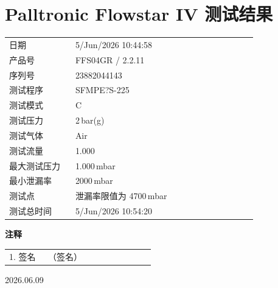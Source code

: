 \documentclass[UTF8,10pt,a4paper,fontset=fandol]{ctexart}
\newcommand{\fieldvalue}[1]{#1}
\newcommand{\handwritten}[1]{#1}
\begin{document}
\section*{Palltronic Flowstar IV 测试结果}

\begin{tabular}{@{}p{0.24\linewidth}p{0.66\linewidth}@{}}
日期 &
\fieldvalue{5/Jun/2026 10:44:58}
\\
产品号 &
\fieldvalue{FFS04GR / 2.2.11}
\\
序列号 &
\fieldvalue{23882044143}
\\
测试程序 &
\fieldvalue{SFMPE?S-225}
\\
测试模式 &
\fieldvalue{C}
\\
测试压力 &
\fieldvalue{2\,bar(g)}
\\
测试气体 &
\fieldvalue{Air}
\\
测试流量 &
\fieldvalue{1.000}
\\
最大测试压力 &
\fieldvalue{1.000\,mbar}
\\
最小泄漏率 &
\fieldvalue{2000\,mbar}
\\
测试点 &
\fieldvalue{泄漏率限值为 4700\,mbar}
\\
测试总时间 &
\fieldvalue{5/Jun/2026 10:54:20}
\end{tabular}

\medskip

\textbf{注释}

\begin{tabular}{@{}p{0.24\linewidth}p{0.66\linewidth}@{}}
1. 签名 &
\fieldvalue{\handwritten{（签名）}}
\\
\end{tabular}

\medskip

\handwritten{2026.06.09}
\end{document}
